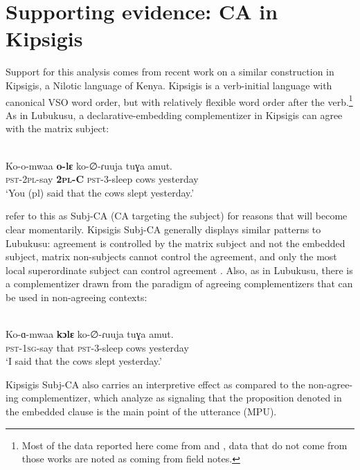 \documentclass[output=paper
,modfonts
,nonflat
]{langsci/langscibook}
\begin{document}
\section{Supporting evidence: CA in Kipsigis}\label{CA in Kipsigis}\largerpage[2]

Support for this analysis comes from recent work on a similar construction in Kipsigis, a Nilotic language of Kenya. Kipsigis is a verb-initial language with canonical VSO word order, but with relatively flexible word order after the verb.\footnote{Most of the data reported here come from \citet{Rao:2016} and \citet{DiercksRao:2017}, data that do not come from those works are noted as coming from field notes.} As in Lubukusu, a declarative-embedding complementizer in Kipsigis can agree with the matrix subject: 

\ea \label{BasicKipsigisSubj-CA}
 \\
\gll Ko-o-mwaa \textbf{o-lɛ} ko-∅-ɾuuja tuɣa amut. \\
\textsc{pst}-2\textsc{pl}-say \textbf{2\textsc{pl}-C} \textsc{pst}-3-sleep cows yesterday \\
\glt `You (pl) said that the cows slept yesterday.'

\z
\noindent \citeauthor{DiercksRao:2017} refer to this as Subj-CA (CA targeting the subject) for reasons that will become clear momentarily. Kipsigis Subj-CA generally displays similar patterns to Lubukusu: agreement is controlled by the matrix subject and not the embedded subject, matrix non-subjects cannot control the agreement, and only the most local superordinate subject can control agreement \citep{Rao:2016,DiercksRao:2017}. Also, as in Lubukusu, there is a complementizer drawn from the paradigm of agreeing complementizers that can be used in non-agreeing contexts:   

\ea \label{KipsigisNon-AgreeingCA}
 \\
\gll	Ko-ɑ-mwaa \textbf{kɔlɛ} ko-∅-ɾuuja tuɣa amut. \\
\textsc{pst}-1\textsc{sg}-say that \textsc{pst}-3-sleep cows yesterday \\
\glt `I said that the cows slept yesterday.'
\z

\noindent Kipsigis Subj-CA also carries an interpretive effect as compared to the non-agree-\newline ing complementizer, which \citet{DiercksRao:2017} analyze as signaling that the proposition denoted in the embedded clause is the main point of the utterance (MPU). 
\end{document}
